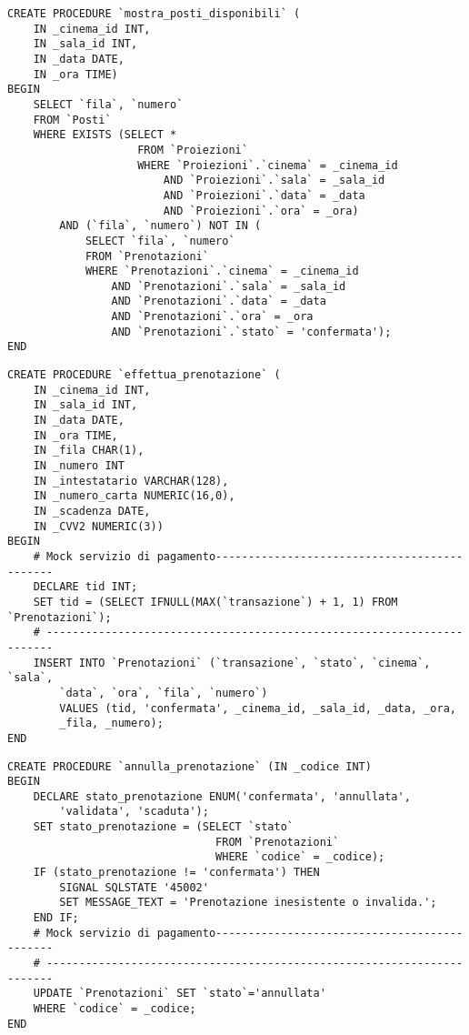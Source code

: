 \begin{verbatim}
CREATE PROCEDURE `mostra_posti_disponibili` (
    IN _cinema_id INT,
    IN _sala_id INT,
    IN _data DATE,
    IN _ora TIME)
BEGIN
    SELECT `fila`, `numero`
    FROM `Posti`
    WHERE EXISTS (SELECT *
                    FROM `Proiezioni`
                    WHERE `Proiezioni`.`cinema` = _cinema_id
                        AND `Proiezioni`.`sala` = _sala_id
                        AND `Proiezioni`.`data` = _data
                        AND `Proiezioni`.`ora` = _ora) 
        AND (`fila`, `numero`) NOT IN (
            SELECT `fila`, `numero`
            FROM `Prenotazioni`
            WHERE `Prenotazioni`.`cinema` = _cinema_id
                AND `Prenotazioni`.`sala` = _sala_id
                AND `Prenotazioni`.`data` = _data
                AND `Prenotazioni`.`ora` = _ora
                AND `Prenotazioni`.`stato` = 'confermata');
END
\end{verbatim}

\pagebreak
\begin{verbatim}
CREATE PROCEDURE `effettua_prenotazione` (
    IN _cinema_id INT,
    IN _sala_id INT,
    IN _data DATE,
    IN _ora TIME,
    IN _fila CHAR(1),
    IN _numero INT
    IN _intestatario VARCHAR(128),
    IN _numero_carta NUMERIC(16,0),
    IN _scadenza DATE,
    IN _CVV2 NUMERIC(3))
BEGIN
    # Mock servizio di pagamento---------------------------------------------
    DECLARE tid INT;
    SET tid = (SELECT IFNULL(MAX(`transazione`) + 1, 1) FROM `Prenotazioni`);
    # -----------------------------------------------------------------------
    INSERT INTO `Prenotazioni` (`transazione`, `stato`, `cinema`, `sala`,
        `data`, `ora`, `fila`, `numero`)
        VALUES (tid, 'confermata', _cinema_id, _sala_id, _data, _ora,
        _fila, _numero);
END
\end{verbatim}

\begin{verbatim}
CREATE PROCEDURE `annulla_prenotazione` (IN _codice INT)
BEGIN
    DECLARE stato_prenotazione ENUM('confermata', 'annullata',
        'validata', 'scaduta');
    SET stato_prenotazione = (SELECT `stato`
                                FROM `Prenotazioni`
                                WHERE `codice` = _codice);
    IF (stato_prenotazione != 'confermata') THEN
        SIGNAL SQLSTATE '45002'
        SET MESSAGE_TEXT = 'Prenotazione inesistente o invalida.';
    END IF;
    # Mock servizio di pagamento---------------------------------------------
    # -----------------------------------------------------------------------
    UPDATE `Prenotazioni` SET `stato`='annullata'
    WHERE `codice` = _codice;
END
\end{verbatim}

